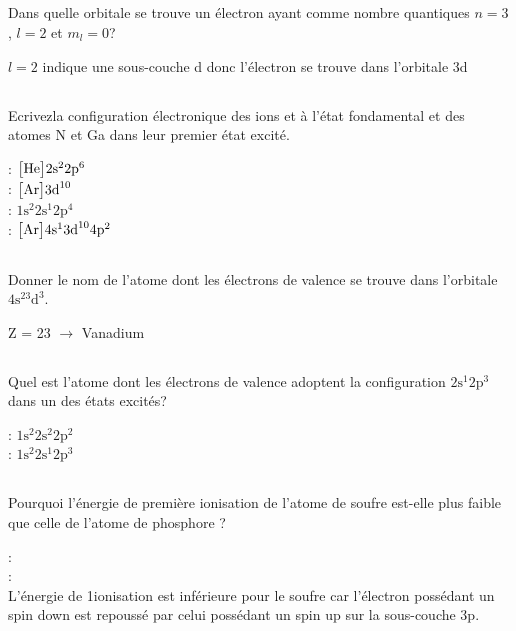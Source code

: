\subsection{}
Dans quelle orbitale se trouve un électron ayant comme nombre quantiques $n=3$, $l=2$ et $m_l = 0$?
\begin{solution}
	$l=2$ indique une sous-couche d donc l'électron se trouve dans l'orbitale 3d
\end{solution}
\subsection{}
Ecrivezla configuration électronique des ions  et  à l'état fondamental et des atomes N et Ga dans leur premier état excité.
\begin{solution}
	: $\big[\ce{He}\big] 2\text{s}^2 2\text{p}^6$\\
	: $\big[\ce{Ar}\big] 3\text{d}^{10}$\\
	: $1\text{s}^2 2\text{s}^1 2\text{p}^4$ \\
	: $\big[\ce{Ar}\big]4\text{s}^1 3\text{d}^{10} 4\text{p}^2$
\end{solution}
\subsection{}
Donner le nom de l'atome dont les électrons de valence se trouve dans l'orbitale $4\text{s}^23\text{d}^3$.
\begin{solution}
	
	Z = 23 $\rightarrow$ Vanadium
\end{solution}
\subsection{}
Quel est l'atome dont les électrons de valence adoptent la configuration $ 2\text{s}^1 2\text{p}^3$ dans un des états excités?

\begin{solution}
	: $1\text{s}^2 2\text{s}^2 2\text{p}^2$\\
	: $1\text{s}^2 2\text{s}^1 2\text{p}^3$
\end{solution}
\subsection{}

Pourquoi l'énergie de première ionisation de l'atome de soufre est-elle plus faible que celle de l'atome de phosphore ?
\begin{solution}
	:\\
	:\\
	L'énergie de 1\ere ionisation est inférieure pour le soufre car l'électron possédant un spin down est repoussé par celui possédant un spin up sur la sous-couche 3p.
\end{solution}

